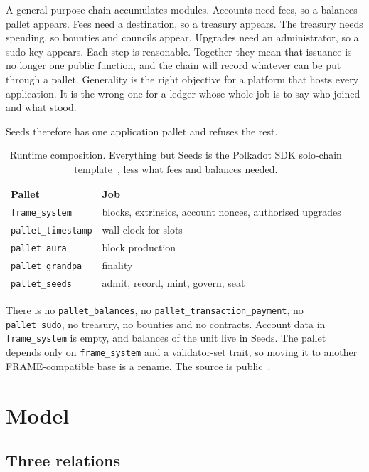 \documentclass[11pt,a4paper]{article}
\theoremstyle{definition}
\theoremstyle{plain}
\theoremstyle{remark}
\begin{document}
A general-purpose chain accumulates modules. Accounts need fees, so a balances pallet appears. Fees need a destination, so a treasury appears. The treasury needs spending, so bounties and councils appear. Upgrades need an administrator, so a sudo key appears. Each step is reasonable. Together they mean that issuance is no longer one public function, and the chain will record whatever can be put through a pallet. Generality is the right objective for a platform that hosts every application. It is the wrong one for a ledger whose whole job is to say who joined and what stood.

Seeds therefore has one application pallet and refuses the rest.

\begin{table}[h]
\centering
\caption{Runtime composition. Everything but Seeds is the Polkadot SDK solo-chain template~\cite{substrate2024}, less what fees and balances needed.}
\label{tab:runtime}
\begin{tabular}{@{}ll@{}}
\toprule
Pallet & Job \\
\midrule
\texttt{frame\_system} & blocks, extrinsics, account nonces, authorised upgrades \\
\texttt{pallet\_timestamp} & wall clock for slots \\
\texttt{pallet\_aura} & block production~\cite{aura2019} \\
\texttt{pallet\_grandpa} & finality~\cite{stewart2020} \\
\texttt{pallet\_seeds} & admit, record, mint, govern, seat \\
\bottomrule
\end{tabular}
\end{table}

There is no \texttt{pallet\_balances}, no \texttt{pallet\_transaction\_payment}, no \texttt{pallet\_sudo}, no treasury, no bounties and no contracts. Account data in \texttt{frame\_system} is empty, and balances of the unit live in Seeds. The pallet depends only on \texttt{frame\_system} and a validator-set trait, so moving it to another FRAME-compatible base is a rename. The source is public~\cite{seedscode}.

\section{Model}
\label{sec:model}

\subsection{Three relations}
\end{document}
